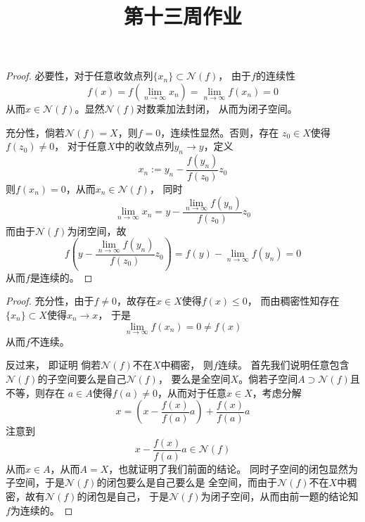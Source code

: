 \documentclass[cn]{homework}
\title{第十三周作业}
\begin{document}
    \maketitle
    
    \problem
    \begin{subproblem}[(\arabic*)]
        \item
        \begin{proof}
            必要性，对于任意收敛点列$\{x_n\}\subset\mathcal N(f)$，
            由于$f$的连续性
            \[f(x)=f(\lim_{n\to\infty}x_n)=\lim_{n\to\infty}f(x_n)=0\]
            从而$x\in\mathcal N(f)$。显然$\mathcal N(f)$对数乘加法封闭，
            从而为闭子空间。
            
            充分性，倘若$\mathcal N(f)=X$，则$f=0$，连续性显然。否则，存在
            $z_0\in X$使得$f(z_0)\neq 0$，
            对于任意$X$中的收敛点列$y_n\to y$，定义
            \[x_n:=y_n-\frac{f(y_n)}{f(z_0)}z_0\]
            则$f(x_n)=0$，从而$x_n\in\mathcal N(f)$，
            同时
            \[\lim_{n\to\infty} x_n=y-\frac{\displaystyle\lim_{n\to\infty}f(y_n)}{f(z_0)}z_0\]
            而由于$\mathcal N(f)$为闭空间，故
            \[f\left(y-\frac{\displaystyle\lim_{n\to\infty}f(y_n)}{f(z_0)}z_0\right)
            =f(y)-\lim_{n\to\infty}f(y_n)=0\]
            从而$f$是连续的。
        \end{proof}

        \item
        \begin{proof}
            充分性，由于$f\neq 0$，故存在$x\in X$使得$f(x)\leq 0$，
            而由稠密性知存在$\{x_n\}\subset X$使得$x_n\to x$，
            于是
            \[\lim_{n\to\infty}f(x_n)=0\neq f(x)\]
            从而$f$不连续。

            反过来，
            即证明
            倘若$\mathcal N(f)$不在$X$中稠密，
            则$f$连续。
            首先我们说明任意包含$\mathcal N(f)$的子空间要么是自己$\mathcal N(f)$，
            要么是全空间$X$。倘若子空间$A\supset\mathcal N(f)$且不等，则存在
            $a\in A$使得$f(a)\neq 0$，从而对于任意$x\in X$，考虑分解
            \[x=\left(x-\frac{f(x)}{f(a)}a\right)+\frac{f(x)}{f(a)}a\]
            注意到
            \[x-\frac{f(x)}{f(a)}a\in\mathcal N(f)\]
            从而$x\in A$，从而$A=X$，也就证明了我们前面的结论。
            同时子空间的闭包显然为子空间，于是$\mathcal N(f)$的闭包要么是自己要么是
            全空间，而由于$\mathcal N(f)$不在$X$中稠密，故有$\mathcal N(f)$的闭包是自己，
            于是$\mathcal N(f)$为闭子空间，从而由前一题的结论知$f$为连续的。
        \end{proof}
    \end{subproblem}
\end{document}
